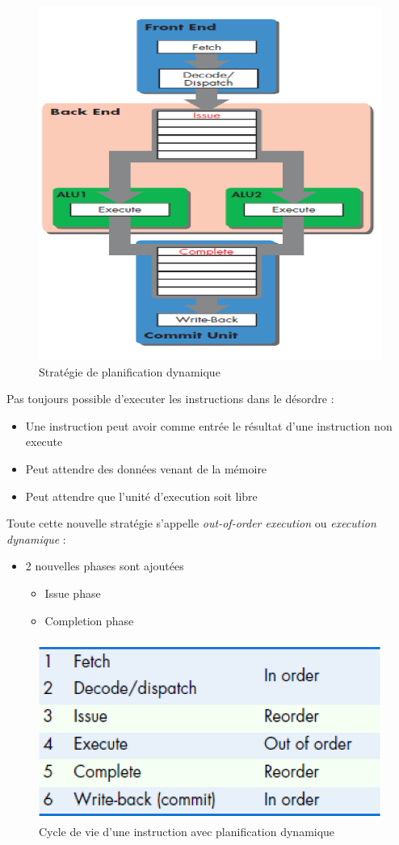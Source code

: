 \documentclass[a4paper]{article}
\begin{document}
  \begin{figure}[H]
    \centering
    \includegraphics[width = 0.5 \textwidth]{images/12.PNG}
    \caption{Stratégie de planification dynamique}
  \end{figure}

  Pas toujours possible d'executer les instructions dans le désordre :
  \begin{itemize}
    \item Une instruction peut avoir comme entrée le résultat d'une instruction non execute
    \item Peut attendre des données venant de la mémoire
    \item Peut attendre que l'unité d'execution soit libre
  \end{itemize}

  Toute cette nouvelle stratégie s'appelle \emph{out-of-order execution} ou \emph{execution dynamique} :
  \begin{itemize}
    \item 2 nouvelles phases sont ajoutées
    \begin{itemize}
      \item Issue phase
      \item Completion phase
    \end{itemize}
  \end{itemize}

  \begin{figure}[H]
    \centering
    \includegraphics[width = 0.5 \textwidth]{images/13.PNG}
    \caption{Cycle de vie d'une instruction avec planification dynamique}
  \end{figure}
\end{document}
